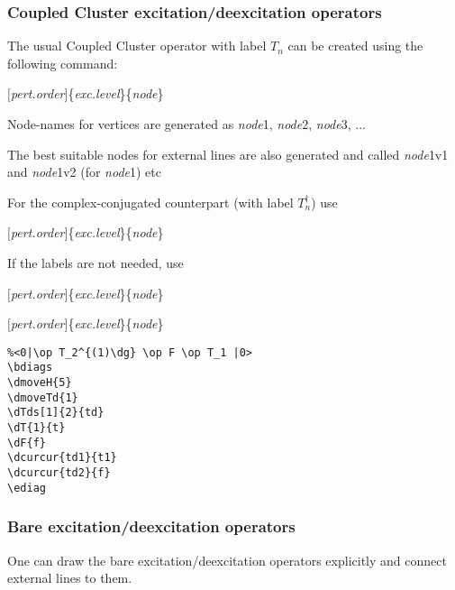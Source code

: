 \documentclass[a4paper]{article}
\newcommand{\myind}{\hspace{10pt}}
\begin{document}
\subsubsection{Coupled Cluster excitation/deexcitation operators}

The usual Coupled Cluster operator with label $T_{n}$ can be created using the following command:

\myind{\bf \textbackslash dT}$[${\it pert.order}$]$\{{\it exc.level}\}\{{\it node}\}

Node-names for vertices are generated as {\it node}1, {\it node}2, {\it node}3, ...

The best suitable nodes for external lines are also generated and called {\it node}1v1 and {\it node}1v2 
(for {\it node}1) etc

For the complex-conjugated counterpart (with label $T^{\dagger}_{n}$) use 

\myind{\bf \textbackslash dTd}$[${\it pert.order}$]$\{{\it exc.level}\}\{{\it node}\}

If the labels are not needed, use

\myind{\bf \textbackslash dTs}$[${\it pert.order}$]$\{{\it exc.level}\}\{{\it node}\}

\myind{\bf \textbackslash dTds}$[${\it pert.order}$]$\{{\it exc.level}\}\{{\it node}\}

 \begin{minipage}[b]{0.55\linewidth}\centering
  \begin{lstlisting}
%<0|\op T_2^{(1)\dg} \op F \op T_1 |0>
\bdiags
\dmoveH{5}
\dmoveTd{1}
\dTds[1]{2}{td}
\dT{1}{t}
\dF{f}
\dcurcur{td1}{t1}
\dcurcur{td2}{f}
\ediag
  \end{lstlisting}
 \end{minipage}
 \begin{minipage}[b]{0.45\linewidth}\centering
\bdiags
{}
\ediag
 \end{minipage}

\subsubsection{Bare excitation/deexcitation operators}

One can draw the bare excitation/deexcitation operators explicitly and connect external lines to them.
\end{document}
